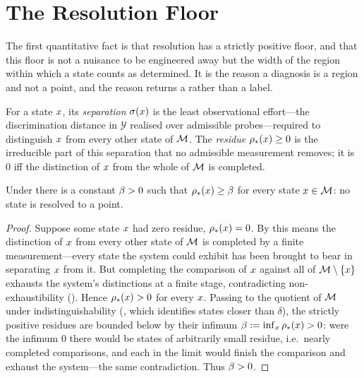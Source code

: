 \section{The Resolution Floor}
\label{cfc:sec:floor}

The first quantitative fact is that resolution has a strictly positive floor,
and that this floor is not a nuisance to be engineered away but the width of
the region within which a state counts as determined. It is the reason a
diagnosis is a region and not a point, and the reason  returns a
 rather than a label.

\begin{definition}
\label{cfc:def:residue}
For a state $x$, its \emph{separation} $\sigma(x)$ is the least
observational effort---the discrimination distance in $\mathcal{Y}$ realised
over admissible probes---required to distinguish $x$ from every other state
of $\mathcal{M}$. The \emph{residue} $\rho_{\ast}(x)\ge0$ is the irreducible part of
this separation that no admissible measurement removes; it is $0$ iff the
distinction of $x$ from the whole of $\mathcal{M}$ is completed.
\end{definition}

\begin{theorem}
\label{cfc:thm:floor}
Under  there is a constant $\beta>0$ such that
$\rho_{\ast}(x)\ge\beta$ for every state $x\in\mathcal{M}$: no state is resolved to
a point.
\end{theorem}

\begin{proof}
Suppose some state $x$ had zero residue, $\rho_{\ast}(x)=0$. By
 this means the distinction of $x$ from every other state
of $\mathcal{M}$ is completed by a finite measurement---every state the system could
exhibit has been brought to bear in separating $x$ from it. But completing
the comparison of $x$ against all of $\mathcal{M}\setminus\{x\}$ exhausts the
system's distinctions at a finite stage, contradicting non-exhaustibility
(). Hence $\rho_{\ast}(x)>0$ for every $x$. Passing to
the quotient of $\mathcal{M}$ under indistinguishability (, which
identifies states closer than $\delta$), the strictly positive residues are
bounded below by their infimum $\beta:=\inf_{x}\rho_{\ast}(x)>0$: were the
infimum $0$ there would be states of arbitrarily small residue, i.e.\ nearly
completed comparisons, and each in the limit would finish the comparison and
exhaust the system---the same contradiction. Thus $\beta>0$.
\end{proof}

